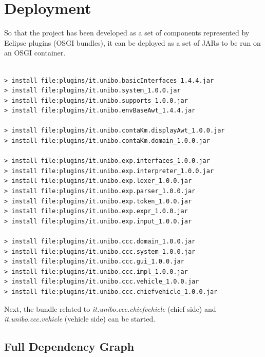 \documentclass{llncs}
\newcommand{\labelsec}[1]{\label{sec:#1}}
\begin{document}
\newpage
\section{Deployment}
\labelsec{Deployment}
 
So that the project has been developed as a set of components represented by Eclipse plugins (OSGI bundles), it can be deployed as a set of JARs to be run on an OSGI container.

\begin{lstlisting}[label=some-code,caption=OSGI bundle installation]

> install file:plugins/it.unibo.basicInterfaces_1.4.4.jar
> install file:plugins/it.unibo.system_1.0.0.jar
> install file:plugins/it.unibo.supports_1.0.0.jar
> install file:plugins/it.unibo.envBaseAwt_1.4.4.jar

> install file:plugins/it.unibo.contaKm.displayAwt_1.0.0.jar
> install file:plugins/it.unibo.contaKm.domain_1.0.0.jar

> install file:plugins/it.unibo.exp.interfaces_1.0.0.jar
> install file:plugins/it.unibo.exp.interpreter_1.0.0.jar
> install file:plugins/it.unibo.exp.lexer_1.0.0.jar
> install file:plugins/it.unibo.exp.parser_1.0.0.jar
> install file:plugins/it.unibo.exp.token_1.0.0.jar
> install file:plugins/it.unibo.exp.expr_1.0.0.jar
> install file:plugins/it.unibo.exp.input_1.0.0.jar

> install file:plugins/it.unibo.ccc.domain_1.0.0.jar
> install file:plugins/it.unibo.ccc.system_1.0.0.jar
> install file:plugins/it.unibo.ccc.gui_1.0.0.jar
> install file:plugins/it.unibo.ccc.impl_1.0.0.jar
> install file:plugins/it.unibo.ccc.vehicle_1.0.0.jar
> install file:plugins/it.unibo.ccc.chiefvehicle_1.0.0.jar
\end{lstlisting}

Next, the bundle related to \emph{it.unibo.ccc.chiefvehicle} (chief side) and \emph{it.unibo.ccc.vehicle} (vehicle side) can be started.

\newpage
\subsection{Full Dependency Graph}
\end{document}
